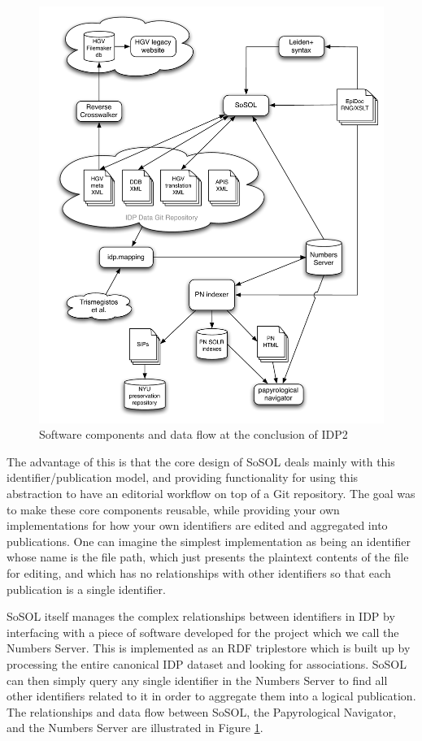 \documentclass[]{article}
\begin{document}
\begin{figure}[h]
  \centering
  \includegraphics[width=6in]{images/TopLevelDataFlow4Proposal-HAC.pdf}
  \caption{Software components and data flow at the conclusion of IDP2\label{dataflow}}
\end{figure}

The advantage of this is that the core design of SoSOL deals mainly with this identifier/publication model, and providing functionality for using this abstraction to have an editorial workflow on top of a Git repository. The goal was to make these core components reusable, while providing your own implementations for how your own identifiers are edited and aggregated into publications. One can imagine the simplest implementation as being an identifier whose name is the file path, which just presents the plaintext contents of the file for editing, and which has no relationships with other identifiers so that each publication is a single identifier.

SoSOL itself manages the complex relationships between identifiers in IDP by interfacing with a piece of software developed for the project which we call the Numbers Server. This is implemented as an RDF triplestore which is built up by processing the entire canonical IDP dataset and looking for associations. SoSOL can then simply query any single identifier in the Numbers Server to find all other identifiers related to it in order to aggregate them into a logical publication. The relationships and data flow between SoSOL, the Papyrological Navigator, and the Numbers Server are illustrated in Figure \ref{dataflow}.
\end{document}
